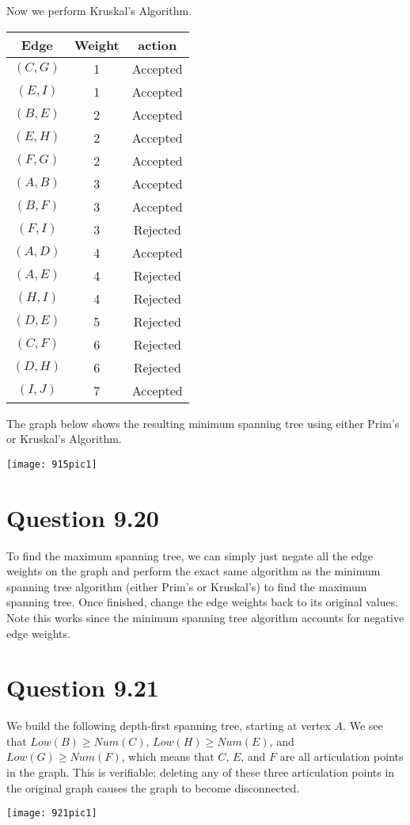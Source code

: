 \documentclass[12pt]{article}
\begin{document}
Now we perform Kruskal's Algorithm.
\begin{center}
\begin{tabular}{ c c c } 
Edge & Weight & action \\
 \hline
$(C,G)$ & 1 & Accepted \\
$(E,I)$ & 1 & Accepted \\
$(B,E)$ & 2 & Accepted \\
$(E,H)$ & 2 & Accepted \\
$(F,G)$ & 2 & Accepted \\
$(A,B)$ & 3 & Accepted \\
$(B,F)$ & 3 & Accepted \\
$(F,I)$ & 3 & Rejected \\
$(A,D)$ & 4 & Accepted \\
$(A,E)$ & 4 & Rejected \\
$(H,I)$ & 4 & Rejected \\
$(D,E)$ & 5 & Rejected \\
$(C,F)$ & 6 & Rejected \\
$(D,H)$ & 6 & Rejected \\
$(I,J)$ & 7 & Accepted \\
\end{tabular}
\end{center}
The graph below shows the resulting minimum spanning tree using either Prim's or Kruskal's Algorithm.
\begin{center}
\texttt{[image: 915pic1]}
\end{center}

\section{Question 9.20}
To find the maximum spanning tree, we can simply just negate all the edge weights on the graph and perform the exact same algorithm as the minimum spanning tree algorithm (either Prim's or Kruskal's) to find the maximum spanning tree. Once finished, change the edge weights back to its original values. Note this works since the minimum spanning tree algorithm accounts for negative edge weights.

\newpage

\section{Question 9.21}
We build the following depth-first spanning tree, starting at vertex $A$. We see that $Low(B) \geq Num(C)$, $Low(H) \geq Num(E)$, and $Low(G) \geq Num(F)$, which means that $C$, $E$, and $F$ are all articulation points in the graph. This is verifiable; deleting any of these three articulation points in the original graph causes the graph to become disconnected.
\begin{center}
\texttt{[image: 921pic1]}
\end{center}
\end{document}
